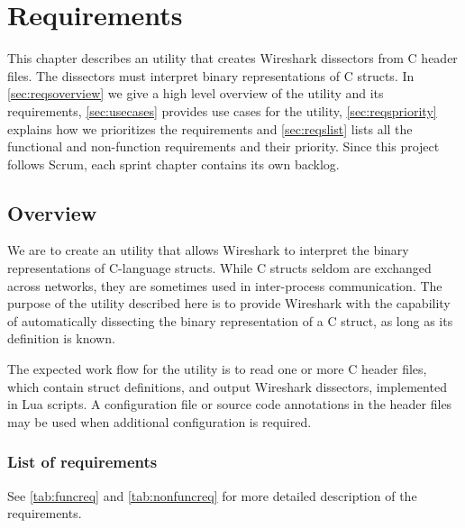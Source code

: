 \chapter{Requirements}
\label{chap:requirements}
This chapter describes an utility that creates Wireshark dissectors from C
header files. The dissectors must interpret binary representations of C
structs. In \autoref{sec:reqsoverview} we give a high level overview of the
utility and its requirements, \autoref{sec:usecases} provides use cases for the
utility, \autoref{sec:reqspriority} explains how we prioritizes the
requirements and \autoref{sec:reqslist} lists all the functional and
non-function requirements and their priority. Since this project follows Scrum,
each sprint chapter contains its own backlog.

\section{Overview}
\label{sec:reqsoverview}
We are to create an utility that allows Wireshark to interpret the binary
representations of C-language structs. While C structs seldom are exchanged
across networks, they are sometimes used in inter-process communication. The
purpose of the utility described here is to provide Wireshark with the
capability of automatically dissecting the binary representation of a C struct,
as long as its definition is known.

The expected work flow for the utility is to read one or more C header files,
which contain struct definitions, and output Wireshark dissectors, implemented
in Lua scripts. A configuration file or source code annotations in the header
files may be used when additional configuration is required.

\subsection{List of requirements}
See \autoref{tab:funcreq} and \autoref{tab:nonfuncreq} for more detailed
description of the requirements.

